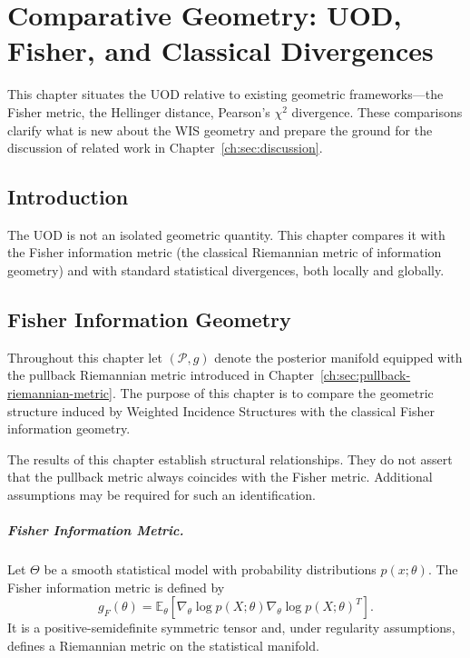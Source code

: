 \chapter[Comparative Geometry]{Comparative Geometry: UOD, Fisher, and Classical Divergences}\label{ch:sec:comparative}


This chapter situates the UOD relative to existing geometric frameworks---the Fisher metric, the Hellinger distance, Pearson's $\chi^2$ divergence. These comparisons clarify what is new about the WIS geometry and prepare the ground for the discussion of related work in Chapter~\ref{ch:sec:discussion}.


\section{Introduction}\label{ch:sec:introduction-comparative_geometry}

The UOD is not an isolated geometric quantity.  This chapter compares
it with the Fisher information metric (the classical Riemannian metric
of information geometry) and with standard statistical divergences,
both locally and globally.

\section{Fisher Information Geometry}\label{ch:sec:fisher-information-geometry}

Throughout this chapter let $(\mathcal P,g)$ denote the posterior manifold equipped with the pullback Riemannian metric introduced in Chapter~\ref{ch:sec:pullback-riemannian-metric}.
The purpose of this chapter is to compare the geometric structure
induced by Weighted Incidence Structures with the classical Fisher
information geometry.
\begin{remark}
The results of this chapter establish structural
relationships. They do not assert that the pullback metric always
coincides with the Fisher metric. Additional assumptions may be
required for such an identification.
\end{remark}
\paragraph{Fisher Information Metric.}
Let $\Theta$ be a smooth statistical model with probability distributions
$p(x;\theta).$
The Fisher information metric is defined by
\[
g_F(\theta)
=
\mathbb E_\theta
\!\left[
\nabla_\theta\log p(X;\theta)
\nabla_\theta\log p(X;\theta)^T
\right].
\]
It is a positive-semidefinite symmetric tensor and, under regularity
assumptions, defines a Riemannian metric on the statistical manifold.

